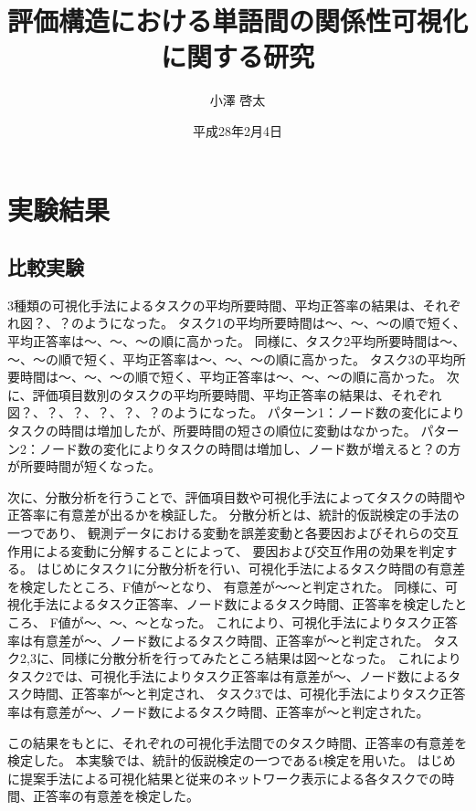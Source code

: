 \documentclass[syuuron]{kuee}
\title{評価構造における単語間の関係性可視化に関する研究}
\author{小澤 啓太}
\date{平成28年2月4日}
\begin{document}
\maketitle
\tableofcontents


\chapter{実験結果}
	\section{比較実験}
	3種類の可視化手法によるタスクの平均所要時間、平均正答率の結果は、それぞれ図？、？のようになった。
	タスク1の平均所要時間は～、～、～の順で短く、平均正答率は～、～、～の順に高かった。
	同様に、タスク2平均所要時間は～、～、～の順で短く、平均正答率は～、～、～の順に高かった。
	タスク3の平均所要時間は～、～、～の順で短く、平均正答率は～、～、～の順に高かった。
	次に、評価項目数別のタスクの平均所要時間、平均正答率の結果は、それぞれ図？、？、？、？、？、？のようになった。
	パターン1：ノード数の変化によりタスクの時間は増加したが、所要時間の短さの順位に変動はなかった。
	パターン2：ノード数の変化によりタスクの時間は増加し、ノード数が増えると？の方が所要時間が短くなった。
	
	次に、分散分析を行うことで、評価項目数や可視化手法によってタスクの時間や正答率に有意差が出るかを検証した。
	分散分析とは、統計的仮説検定の手法の一つであり、
	観測データにおける変動を誤差変動と各要因およびそれらの交互作用による変動に分解することによって、
	要因および交互作用の効果を判定する。
	はじめにタスク1に分散分析を行い、可視化手法によるタスク時間の有意差を検定したところ、F値が～となり、
	有意差が～～と判定された。
	同様に、可視化手法によるタスク正答率、ノード数によるタスク時間、正答率を検定したところ、
	F値が～、～、～となった。
	これにより、可視化手法によりタスク正答率は有意差が～、ノード数によるタスク時間、正答率が～と判定された。
	タスク2,3に、同様に分散分析を行ってみたところ結果は図～となった。
	これによりタスク2では、可視化手法によりタスク正答率は有意差が～、ノード数によるタスク時間、正答率が～と判定され、
	タスク3では、可視化手法によりタスク正答率は有意差が～、ノード数によるタスク時間、正答率が～と判定された。
	
	この結果をもとに、それぞれの可視化手法間でのタスク時間、正答率の有意差を検定した。
	本実験では、統計的仮説検定の一つであるt検定を用いた。
	はじめに提案手法による可視化結果と従来のネットワーク表示による各タスクでの時間、正答率の有意差を検定した。
	
\end{document}
